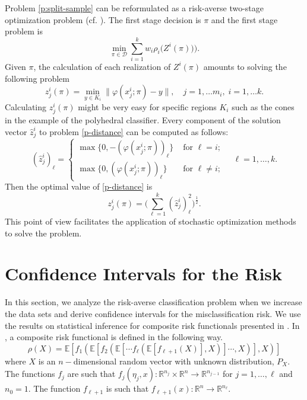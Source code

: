 \documentclass[10pt,letterpaper]{article}
\newcommand{\Dc}{\mathcal{D}}
\newcommand{\1}{1{\hskip -2.55 pt}\hbox{I}}
\begin{document}
Problem \eqref{p:split-sample} can be reformulated as a risk-averse two-stage optimization problem (cf. \cite{SDR}).
The first stage decision is $\pi$ and the first stage problem is 
\begin{equation}
\label{p:first-stage}
\min_{ \pi\in\Dc} \sum_{i=1}^k w_i\rho_i\big(Z^i(\pi))\big) .
\end{equation}
Given $\pi$, the calculation of each realization of $Z^i(\pi)$ amounts to solving the following problem 
\begin{equation}
\label{p-distance}
z^i_j(\pi)= \min_{y\in K_i} \| \varphi(x^i_j;\pi) -y\|, \quad j=1,\dots m_i,\;  i=1,\dots k.
\end{equation}
Calculating $z^i_j(\pi)$ might be very easy for specific regions $K_i$  such as the cones in the example of the polyhedral classifier.
Every component of the solution vector $\hat{z}^i_j$ to problem \eqref{p-distance} can be computed as follows:
\[
(\hat{z}^i_j)_\ell = \begin{cases} \max \{0, -(\varphi(x^i_j;\pi))_\ell\} &\text{ for } \ell= i;\\
 \max \{0, (\varphi(x^i_j;\pi))_\ell\} &\text{ for } \ell\ne i; 
 \end{cases}
 \quad \ell =1,\dots, k.
\]
Then the optimal value of \eqref{p-distance} is
\[
z^i_j(\pi) = \Big( \sum_{\ell=1}^k (\hat{z}^i_j)_\ell^2\Big)^{\frac{1}{2}}.
\]
This point of view facilitates the application of stochastic optimization methods to solve the problem.


\section{Confidence Intervals for the Risk}
\label{sec:confidence}

In this section, we analyze the risk-averse classification problem when we increase the data sets and derive confidence intervals for the misclassification risk. 
We use the results on statistical inference for composite risk functionals presented in \cite{dentcheva2016statistical}.
In \cite{dentcheva2016statistical}, a composite risk functional is defined in the following way.  
\begin{equation}\label{defcrf}
 \rho (X) = \mathbb{E} \left[ f_{1}\left( \mathbb{E} \left[  f_{2}\left( \mathbb{E} \left[ \cdots f_{\ell}\left(\mathbb{E}\left[ f_{\ell+1}\left( X \right)\right],X\right)\right]\cdots,X \right)\right],X\right)\right] 
\end{equation}
where $X$ is an $n-$dimensional random vector with unknown distribution, $P_{X}$. The functions $f_{j}$ are such that $f_{j}(\eta_{j},x):\mathbb{R}^{n_{j}}\times \mathbb{R}^{n} \rightarrow \mathbb{R}^{n_{j-1}}$ for $j = 1,\ldots,\ell$ and $n_{0} = 1$. The function $f_{\ell+1}$ is such that $f_{\ell+1}(x):\mathbb{R}^{n} \rightarrow \mathbb{R}^{n_{\ell}}$. 
\end{document}
